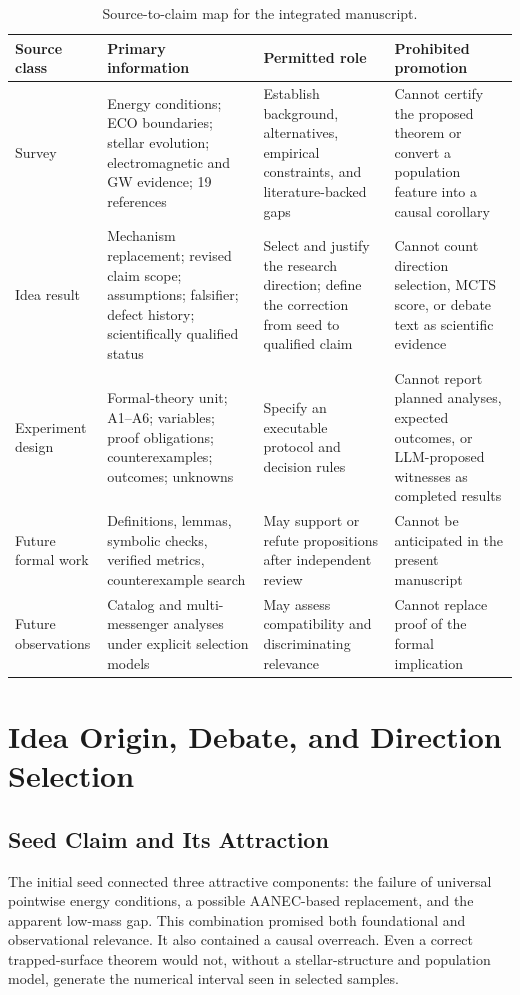 \documentclass[conference]{IEEEtran}
\begin{document}
\begin{table}[t]
\caption{Source-to-claim map for the integrated manuscript.}
\label{tab:source-map}
\centering
\scriptsize
\setlength{\tabcolsep}{3pt}
\begin{tabular}{p{}p{}p{}p{}}
\toprule
\textbf{Source class} & \textbf{Primary information} & \textbf{Permitted role} & \textbf{Prohibited promotion}\\
\midrule
Survey & Energy conditions; ECO boundaries; stellar evolution; electromagnetic and GW evidence; 19 references & Establish background, alternatives, empirical constraints, and literature-backed gaps & Cannot certify the proposed theorem or convert a population feature into a causal corollary\\
Idea result & Mechanism replacement; revised claim scope; assumptions; falsifier; defect history; scientifically qualified status & Select and justify the research direction; define the correction from seed to qualified claim & Cannot count direction selection, MCTS score, or debate text as scientific evidence\\
Experiment design & Formal-theory unit; A1--A6; variables; proof obligations; counterexamples; outcomes; unknowns & Specify an executable protocol and decision rules & Cannot report planned analyses, expected outcomes, or LLM-proposed witnesses as completed results\\
Future formal work & Definitions, lemmas, symbolic checks, verified metrics, counterexample search & May support or refute propositions after independent review & Cannot be anticipated in the present manuscript\\
Future observations & Catalog and multi-messenger analyses under explicit selection models & May assess compatibility and discriminating relevance & Cannot replace proof of the formal implication\\
\bottomrule
\end{tabular}
\end{table}

\section{Idea Origin, Debate, and Direction Selection}
\label{sec:idea}

\subsection{Seed Claim and Its Attraction}
The initial seed connected three attractive components: the failure of universal pointwise energy conditions, a possible AANEC-based replacement, and the apparent low-mass gap. This combination promised both foundational and observational relevance. It also contained a causal overreach. Even a correct trapped-surface theorem would not, without a stellar-structure and population model, generate the numerical interval seen in selected samples.
\end{document}
